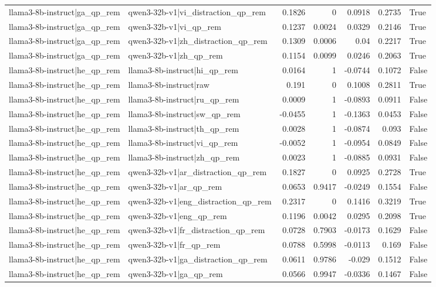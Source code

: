 \begin{table}
\begin{tabular}{l l r r r r l}
llama3-8b-instruct|ga_qp_rem & qwen3-32b-v1|vi_distraction_qp_rem & 0.1826 & 0 & 0.0918 & 0.2735 & True \\
llama3-8b-instruct|ga_qp_rem & qwen3-32b-v1|vi_qp_rem & 0.1237 & 0.0024 & 0.0329 & 0.2146 & True \\
llama3-8b-instruct|ga_qp_rem & qwen3-32b-v1|zh_distraction_qp_rem & 0.1309 & 0.0006 & 0.04 & 0.2217 & True \\
llama3-8b-instruct|ga_qp_rem & qwen3-32b-v1|zh_qp_rem & 0.1154 & 0.0099 & 0.0246 & 0.2063 & True \\
llama3-8b-instruct|he_qp_rem & llama3-8b-instruct|hi_qp_rem & 0.0164 & 1 & -0.0744 & 0.1072 & False \\
llama3-8b-instruct|he_qp_rem & llama3-8b-instruct|raw & 0.191 & 0 & 0.1008 & 0.2811 & True \\
llama3-8b-instruct|he_qp_rem & llama3-8b-instruct|ru_qp_rem & 0.0009 & 1 & -0.0893 & 0.0911 & False \\
llama3-8b-instruct|he_qp_rem & llama3-8b-instruct|sw_qp_rem & -0.0455 & 1 & -0.1363 & 0.0453 & False \\
llama3-8b-instruct|he_qp_rem & llama3-8b-instruct|th_qp_rem & 0.0028 & 1 & -0.0874 & 0.093 & False \\
llama3-8b-instruct|he_qp_rem & llama3-8b-instruct|vi_qp_rem & -0.0052 & 1 & -0.0954 & 0.0849 & False \\
llama3-8b-instruct|he_qp_rem & llama3-8b-instruct|zh_qp_rem & 0.0023 & 1 & -0.0885 & 0.0931 & False \\
llama3-8b-instruct|he_qp_rem & qwen3-32b-v1|ar_distraction_qp_rem & 0.1827 & 0 & 0.0925 & 0.2728 & True \\
llama3-8b-instruct|he_qp_rem & qwen3-32b-v1|ar_qp_rem & 0.0653 & 0.9417 & -0.0249 & 0.1554 & False \\
llama3-8b-instruct|he_qp_rem & qwen3-32b-v1|eng_distraction_qp_rem & 0.2317 & 0 & 0.1416 & 0.3219 & True \\
llama3-8b-instruct|he_qp_rem & qwen3-32b-v1|eng_qp_rem & 0.1196 & 0.0042 & 0.0295 & 0.2098 & True \\
llama3-8b-instruct|he_qp_rem & qwen3-32b-v1|fr_distraction_qp_rem & 0.0728 & 0.7903 & -0.0173 & 0.1629 & False \\
llama3-8b-instruct|he_qp_rem & qwen3-32b-v1|fr_qp_rem & 0.0788 & 0.5998 & -0.0113 & 0.169 & False \\
llama3-8b-instruct|he_qp_rem & qwen3-32b-v1|ga_distraction_qp_rem & 0.0611 & 0.9786 & -0.029 & 0.1512 & False \\
llama3-8b-instruct|he_qp_rem & qwen3-32b-v1|ga_qp_rem & 0.0566 & 0.9947 & -0.0336 & 0.1467 & False \\

\end{tabular}
\end{table}
